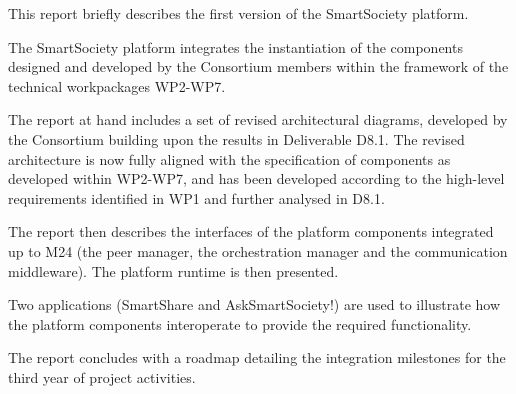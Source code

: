 This report briefly describes the first version of the SmartSociety platform. 

The SmartSociety platform integrates the instantiation of the components designed and developed by the Consortium members within the framework of the technical workpackages WP2-WP7. 

The report at hand includes a set of revised architectural diagrams, developed by the Consortium building upon the results in Deliverable D8.1. The revised architecture is now fully aligned with the specification of components as developed within WP2-WP7, and has been developed according to the high-level requirements identified in WP1 and further analysed in D8.1.

The report then describes the interfaces of the platform components integrated up to M24 (the peer manager, the orchestration manager and the communication middleware). The platform runtime is then presented.

Two applications (SmartShare and AskSmartSociety!) are used to illustrate how the platform components interoperate to provide the required functionality.

The report concludes with a roadmap detailing the integration milestones for the third year of project activities. 

